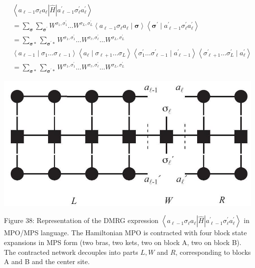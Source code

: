\documentclass[12pt]{article}
\begin{document}
$$
\begin{aligned}
& \left\langle a_{\ell-1} \sigma_{\ell} a_{\ell}|\hat{H}| a_{\ell-1}^{\prime} \sigma_{\ell}^{\prime} a_{\ell}^{\prime}\right\rangle \\
& =\sum_{\boldsymbol{\sigma}} \sum_{\boldsymbol{\sigma}^{\prime}} W^{\sigma_{1}, \sigma_{1}^{\prime}} \ldots W^{\sigma_{L}, \sigma_{L}^{\prime}}\left\langle a_{\ell-1} \sigma_{\ell} a_{\ell} \mid \boldsymbol{\sigma}\right\rangle\left\langle\boldsymbol{\sigma}^{\prime} \mid a_{\ell-1}^{\prime} \sigma_{\ell}^{\prime} a_{\ell}^{\prime}\right\rangle \\
& =\sum_{\boldsymbol{\sigma} *} \sum_{\boldsymbol{\sigma}^{\prime} *} W^{\sigma_{1}, \sigma_{1}^{\prime}} \ldots W^{\sigma_{\ell}, \sigma_{\ell}^{\prime}} \ldots W^{\sigma_{L}, \sigma_{L}^{\prime}} \\
& \left\langle a_{\ell-1} \mid \sigma_{1} \ldots \sigma_{\ell-1}\right\rangle\left\langle a_{\ell} \mid \sigma_{\ell+1} \ldots \sigma_{L}\right\rangle\left\langle\sigma_{1}^{\prime} \ldots \sigma_{\ell-1}^{\prime} \mid a_{\ell-1}^{\prime}\right\rangle\left\langle\sigma_{\ell+1}^{\prime} \ldots \sigma_{L}^{\prime} \mid a_{\ell}^{\prime}\right\rangle \\
& =\sum_{\boldsymbol{\sigma} *} \sum_{\boldsymbol{\sigma}^{\prime} *} W^{\sigma_{1}, \sigma_{1}^{\prime}} \ldots W^{\sigma_{\ell}, \sigma_{\ell}^{\prime}} \ldots W^{\sigma_{L}, \sigma_{L}^{\prime}}
\end{aligned}
$$

\begin{center}
\includegraphics[max width=\textwidth]{2024_05_04_afc4ad226da9ccfe0ac8g-062}
\end{center}

Figure 38: Representation of the DMRG expression $\left\langle a_{\ell-1} \sigma_{\ell} a_{\ell}|\hat{H}| a_{\ell-1}^{\prime} \sigma_{\ell}^{\prime} a_{\ell}^{\prime}\right\rangle$ in MPO/MPS language. The Hamiltonian MPO is contracted with four block state expansions in MPS form (two bras, two kets, two on block A, two on block B). The contracted network decouples into parts $L, W$ and $R$, corresponding to blocks A and B and the center site.
\end{document}
